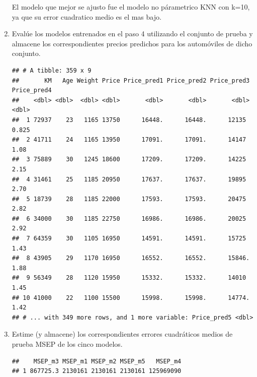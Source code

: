 \documentclass[11pt,letterpaper]{article}\usepackage[]{graphicx}\usepackage[]{color}
\makeatletter
\newenvironment{kframe}{%
 \def\at@end@of@kframe{}%
 \ifinner\ifhmode%
  \def\at@end@of@kframe{\end{minipage}}%
  \begin{minipage}{\columnwidth}%
 \fi\fi%
 \def\FrameCommand##1{\hskip\@totalleftmargin \hskip-\fboxsep
 \colorbox{shadecolor}{##1}\hskip-\fboxsep
     \hskip-\linewidth \hskip-\@totalleftmargin \hskip\columnwidth}%
 \MakeFramed {\advance\hsize-\width
   \@totalleftmargin\z@ \linewidth\hsize
   \@setminipage}}%
 {\par\unskip\endMakeFramed%
 \at@end@of@kframe}
\newenvironment{knitrout}{}{} %
\makeatother
\begin{document}
\begin{enumerate}
   El modelo que mejor se ajusto fue el modelo no párametrico KNN con k=10, ya que su error cuadratico medio es el mas bajo.\\
    \item Evalúe los modelos entrenados en el paso 4 utilizando el conjunto de prueba y almacene los correspondientes precios predichos para los automóviles de dicho conjunto.
\begin{knitrout}
\color{fgcolor}\begin{kframe}
\begin{verbatim}
## # A tibble: 359 x 9
##       KM   Age Weight Price Price_pred1 Price_pred2 Price_pred3 Price_pred4
##    <dbl> <dbl>  <dbl> <dbl>       <dbl>       <dbl>       <dbl>       <dbl>
##  1 72937    23   1165 13750      16448.      16448.      12135        0.825
##  2 41711    24   1165 13950      17091.      17091.      14147        1.08 
##  3 75889    30   1245 18600      17209.      17209.      14225        2.15 
##  4 31461    25   1185 20950      17637.      17637.      19895        2.70 
##  5 18739    28   1185 22000      17593.      17593.      20475        2.82 
##  6 34000    30   1185 22750      16986.      16986.      20025        2.92 
##  7 64359    30   1105 16950      14591.      14591.      15725        1.43 
##  8 43905    29   1170 16950      16552.      16552.      15846.       1.88 
##  9 56349    28   1120 15950      15332.      15332.      14010        1.45 
## 10 41000    22   1100 15500      15998.      15998.      14774.       1.42 
## # ... with 349 more rows, and 1 more variable: Price_pred5 <dbl>
\end{verbatim}
\end{kframe}
\end{knitrout}
    \item Estime (y almacene) los correspondientes errores cuadráticos medios de prueba MSEP de los cinco modelos.
\begin{knitrout}
\color{fgcolor}\begin{kframe}
\begin{verbatim}
##    MSEP_m3 MSEP_m1 MSEP_m2 MSEP_m5   MSEP_m4
## 1 867725.3 2130161 2130161 2130161 125969090
\end{verbatim}
\end{kframe}
\end{knitrout}
    

\end{enumerate}
\end{document}
